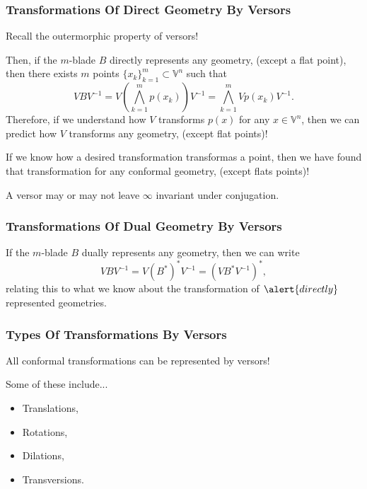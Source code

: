 \documentclass{beamer}
\newcommand{\V}{\mathbb{V}}
\newcommand{\nvai}{\infty}
\begin{document}
\begin{frame}
\frametitle{Transformations Of \alert{Direct} Geometry By Versors}
\pause
Recall the \alert{outermorphic} property of versors!\pause

Then, if the $m$-blade $B$ \alert{directly} represents
any geometry, (\alert{except a flat point}), then there exists $m$
points $\{x_k\}_{k=1}^m\subset\V^n$ such that
\begin{equation*}
VBV^{-1} = V\left(\bigwedge_{k=1}^m p(x_k)\right)V^{-1} = \bigwedge_{k=1}^m Vp(x_k)V^{-1}.
\end{equation*}\pause
Therefore, if we understand how $V$ transforms $p(x)$ for any $x\in\V^n$, then we can
predict how $V$ transforms any geometry, (\alert{except flat points})!\pause

If we know how a desired transformation transformas a point, then we have
found that transformation for any conformal geometry, (\alert{except flats points})!\pause

A versor may or may not leave $\nvai$ invariant under conjugation.
\end{frame}

\begin{frame}
\frametitle{Transformations Of \alert{Dual} Geometry By Versors}
\pause
If the $m$-blade $B$ \alert{dually} represents any geometry, then we can write
\begin{equation*}
VBV^{-1} = V(B^*)^*V^{-1} = (VB^*V^{-1})^*,
\end{equation*}
relating this to what we know about the transformation of $\alert{directly}$ represented geometries.
\end{frame}

\begin{frame}
\frametitle{Types Of Transformations By Versors}
\pause
All conformal transformations can be represented by \alert{versors}!

Some of these include...
\begin{itemize}
\item \alert{Translations},
\item \alert{Rotations},
\item \alert{Dilations},
\item \alert{Transversions}.
\end{itemize}
\end{frame}
\end{document}
